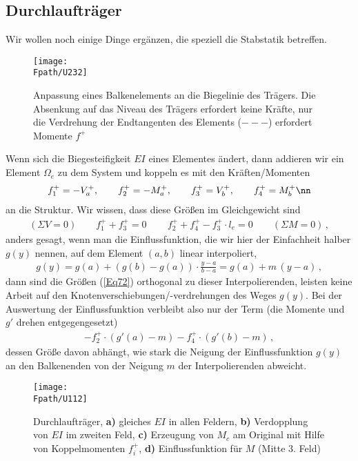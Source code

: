 {{{{{{{%
\textcolor{blau2}{\section{Durchlauftr\"{a}ger}}

Wir wollen noch einige Dinge erg\"{a}nzen, die speziell die Stabstatik betreffen.
\begin{figure}[tbp]
\centering
\texttt{[image: \\Fpath/U232]}
\caption{Anpassung eines Balkenelements an die Biegelinie des Tr\"{a}gers. Die Absenkung auf das Niveau des Tr\"{a}gers erfordert keine Kr\"{a}fte, nur die Verdrehung der Endtangenten des Elements ($- - - $) erfordert Momente $f^+$}
\label{U232}
\end{figure}%

Wenn sich die Biegesteifigkeit $EI$ eines Elementes \"{a}ndert, dann addieren wir ein Element $\Omega_e$ zu dem System
und koppeln es mit den Kr\"{a}ften/Momenten
\begin{align}\label{Eq72}
f_1^+ = - V_a^+,\qquad f_2^+ = - M_a^+, \qquad f_3^+ = V_b^+, \qquad f_4^+ = M_b^+\nn
\end{align}
an die Struktur. Wir wissen, dass diese Gr\"{o}{\ss}en im Gleichgewicht sind
\begin{align}
(\Sigma V = 0) \qquad f_1^+ + f_3^+ = 0\,\qquad  f_2^+ + f_4^+ - f_3^+ \cdot l_e = 0 \qquad (\Sigma M = 0)\,,
\end{align}
anders gesagt, wenn man die Einflussfunktion, die wir hier der Einfachheit halber $g(y)$ nennen, auf dem Element $(a,b)$ linear interpoliert,
\begin{align}
g(y) = g(a) + (g(b) - g(a)) \cdot \frac{y - a}{b - a} = g(a) + m\,(y - a)\,,
\end{align}
dann sind die Gr\"{o}{\ss}en (\ref{Eq72}) orthogonal zu dieser Interpolierenden, leisten keine Arbeit auf den Knotenverschiebungen/-verdrehungen des Weges $g(y)$. Bei der Auswertung der Einflussfunktion verbleibt also nur der Term (die Momente und $g'$ drehen entgegengesetzt)
\begin{align}\label{Eq73}
- f_2^+ \cdot (g'(a) - m) - f_4^+ \cdot (g'(b) - m)\,,
\end{align}
dessen Gr\"{o}{\ss}e davon abh\"{a}ngt, wie stark die Neigung der Einflussfunktion $g(y)$ an den Balkenenden von der Neigung $m$ der Interpolierenden abweicht.
\begin{figure}[tbp]
\centering
\texttt{[image: \\Fpath/U112]}
\caption{Durchlauftr\"{a}ger, \textbf{ a)} gleiches $EI$ in allen Feldern, \textbf{ b)} Verdopplung von $EI$ im zweiten Feld, \textbf{ c)} Erzeugung von
$M_c$ am Original mit Hilfe von Koppelmomenten $f_i^+$, \textbf{ d)} Einflussfunktion f\"{u}r $M$ (Mitte 3. Feld)}
\label{U112}
\end{figure}%

}}}}}}}
